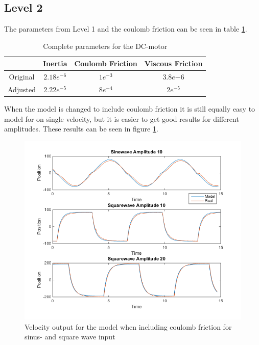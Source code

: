 \documentclass[12pt,a4paper]{article}
\begin{document}
\subsection*{Level 2}
The parameters from Level 1 and the coulomb friction can be seen in
table \ref{tab:parametersL2}.
\begin{center}
  \begin{table}[H]
    \centering
    \caption{Complete parameters for the DC-motor}
    \begin{tabular}{|c|c|c|c|}
        \hline
        & Inertia & Coulomb Friction & Viscous Friction \\ 
        \hline
        Original & $2.18e^{-6}$ & $1e^{-3}$ & $3.8e{-6}$ \\
        \hline
        Adjusted & $2.22e^{-5}$ & $8e^{-4}$ & $2e^{-5}$ \\
        \hline
    \end{tabular}
   \label{tab:parametersL2}
  \end{table}
\end{center}
When the model is changed to include coulomb friction it is still
equally easy to model for on single velocity, but it is easier to get
good results for different amplitudes. These results can be seen in
figure \ref{fig:par_level2}.
\begin{center}
  \begin{figure}[H]
    \centering
    \includegraphics[scale=0.6]{par_level2.png}
    \caption{Velocity output for the model when including coulomb
    friction for sinus- and square wave input}
    \label{fig:par_level2}
    \end{figure}
\end{center}
\end{document}
